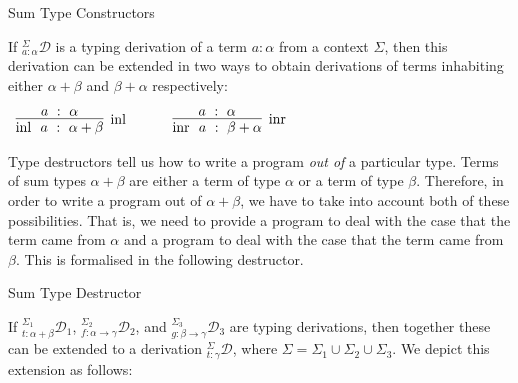 \documentclass{book}
\begin{document}
    {Sum Type Constructors}

        If $^{\Sigma}_{a : \alpha}\mathcal{D}$ is a typing derivation of a term $a : \alpha$ from a context $\Sigma$, then this derivation can be extended in two ways to obtain derivations of terms inhabiting either $\alpha + \beta$ and $\beta + \alpha$ respectively: 

        \begin{center}
            $\begin{array}{c c c}
              \infer[\text{\inl}]{\inl \ a \ : \ \alpha + \beta}{a \ : \ \alpha}
        
              &
              \quad
              &
        
              \infer[\text{\inr}]{\inr \ a \ : \ \beta + \alpha}{a \ : \ \alpha}
        
            \end{array}$
          \end{center}
    

    Type destructors tell us how to write a program \emph{out of} a particular type. Terms of sum types $\alpha + \beta$ are either a term of type $\alpha$ or a term of type $\beta$. Therefore, in order to write a program out of $\alpha + \beta$, we have to take into account both of these possibilities. That is, we need to provide a program to deal with the case that the term came from $\alpha$ and a program to deal with the case that the term came from $\beta$. This is formalised in the following destructor. 

    {Sum Type Destructor}

        If $^{\Sigma_{1}}_{t : \alpha + \beta}\mathcal{D}_{1}$, $^{\Sigma_{2}}_{f : \alpha\rightarrow\gamma}\mathcal{D}_{2}$, and $^{\Sigma_{3}}_{g : \beta\rightarrow\gamma}\mathcal{D}_{3}$ are typing derivations, then together these can be extended to a derivation $^{\Sigma}_{t : \gamma}\mathcal{D}$, where $\Sigma = \Sigma_{1} \cup \Sigma_{2} \cup \Sigma_{3}$. We depict this extension as follows: 
\end{document}
